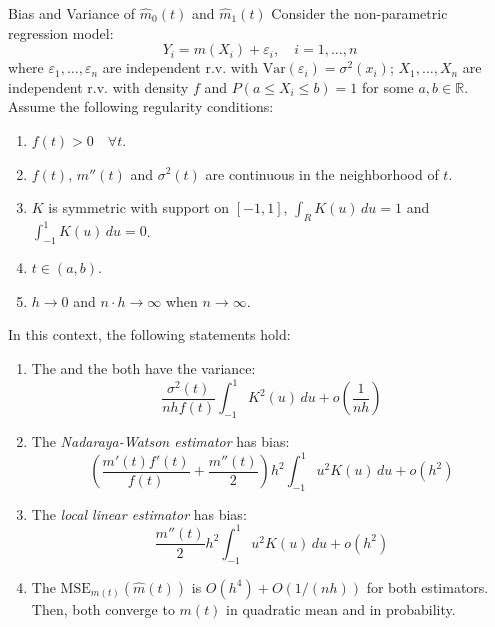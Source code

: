 \begin{theorem}{Bias and Variance of $\hat m_0(t)$ and $\hat m_1(t)$}{}
    Consider the non-parametric regression model:
    \begin{equation*}
        Y_i = m(X_i) + \varepsilon_i, \quad i = 1, \ldots, n
    \end{equation*}
    where $\varepsilon_1, \ldots, \varepsilon_n$ are independent r.v. with
    $\text{Var}(\varepsilon_i) = \sigma^2(x_i)$; $X_1, \ldots, X_n$ are
    independent r.v. with density $f$ and $P(a \leq X_i \leq b) = 1$ for some
    $a, b \in \mathbb R$. Assume the following regularity conditions:
    \begin{enumerate}
        \item $f(t) > 0\quad\forall t$.
        \item $f(t),\, m''(t)$ and $\sigma^2(t)$ are continuous in the neighborhood of $t$.
        \item $K$ is symmetric with support on $[-1, 1]$, $\int_R K(u) \, du = 1$ and
            $\int_{-1}^1 K(u) \, du = 0$.
        \item $t \in (a, b)$.
        \item $h \to 0$ and $n\cdot h \to \infty$ when $n \to \infty$.
    \end{enumerate}
    \tcbline
    In this context, the following statements hold:
    \begin{enumerate}
        \item The  and the 
            both have the variance:
            \begin{equation*}
                \frac{\sigma^2(t)}{nhf(t)} \int_{-1}^1 K^2(u) \, du + o\left(\frac{1}{nh}\right)
            \end{equation*}
        \item The \emph{Nadaraya-Watson estimator} has bias:
            \begin{equation*}
                \left(
                    \frac{m'(t)f'(t)}{f(t)} + \frac{m''(t)}{2}
                \right)h^2
                \int_{-1}^1 u^2K(u) \, du + o\left(h^2\right)
            \end{equation*}
        \item The \emph{local linear estimator} has bias:
            \begin{equation*}
                    \frac{m''(t)}{2} h^2
                \int_{-1}^1 u^2K(u) \, du + o\left(h^2\right)
            \end{equation*}
        \item The $\text{MSE}_{m(t)}(\hat m(t))$ is $O(h^4) + O(1/(nh))$ for both estimators.
            Then, both converge to $m(t)$ in quadratic mean and in probability.
    \end{enumerate}
\end{theorem}

